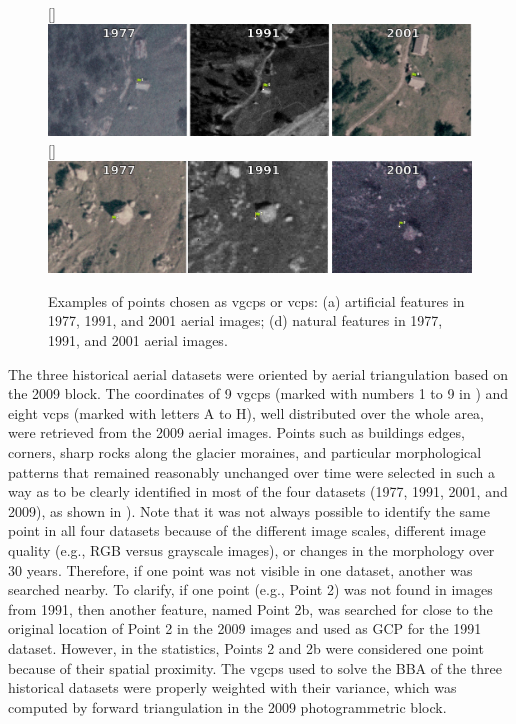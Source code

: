\begin{figure} [ht!]
    \centering
    \subcaptionbox{\label{fig:2:gcp_examples:artificial}}[\textwidth]{
        \includegraphics[width=\textwidth]{artificial_gcps}
    } \\
    \subcaptionbox{\label{fig:2:gcp_examples:natural}}[\textwidth]{
        \includegraphics[width=\textwidth]{natural_gcps}
    }
    \caption{Examples of points chosen as \acp{vgcp} or \acp{vcp}: (a) artificial features in 1977, 1991, and 2001 aerial images; (d) natural features in 1977, 1991, and 2001 aerial images.}
    \label{fig:2:gcp_examples}
\end{figure}

The three historical aerial datasets were oriented by aerial triangulation based on the 2009 block.
The coordinates of 9 \acp{vgcp} (marked with numbers 1 to 9 in ) and eight \acp{vcp} (marked with letters A to H), well distributed over the whole area, were retrieved from the 2009 aerial images.
Points such as buildings edges, corners, sharp rocks along the glacier moraines, and particular morphological patterns that remained reasonably unchanged over time were selected in such a way as to be clearly identified in most of the four datasets (1977, 1991, 2001, and 2009), as shown in ).
Note that it was not always possible to identify the same point in all four datasets because of the different image scales, different image quality (e.g., RGB versus grayscale images), or changes in the morphology over 30 years. 
Therefore, if one point was not visible in one dataset, another was searched nearby.
To clarify, if one point (e.g., Point 2) was not found in images from 1991, then another feature, named Point 2b, was searched for close to the original location of Point 2 in the 2009 images and used as GCP for the 1991 dataset.
However, in the statistics, Points 2 and 2b were considered one point because of their spatial proximity.
The \acp{vgcp} used to solve the BBA of the three historical datasets were properly weighted with their variance, which was computed by forward triangulation in the 2009 photogrammetric block. 

